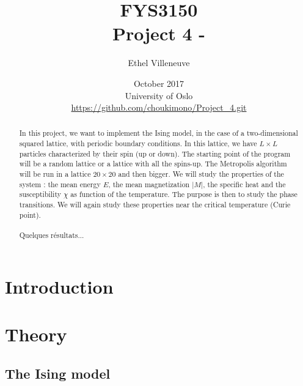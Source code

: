 \documentclass[a4paper, twoside, 11pt]{report}
\title{FYS3150\\Project 4 - }
\author{Ethel Villeneuve}
\date{October 2017 \\University of Oslo \\ \url{https://github.com/choukimono/Project_4.git}}
\theoremstyle{theorem}
\theoremstyle{remark}
\theoremstyle{exemple}
\begin{document}
\maketitle
	
	
\begin{abstract}
    
    \paragraph{}In this project, we want to implement the Ising model, in the case of a two-dimensional squared lattice, with periodic boundary conditions. In this lattice, we have $L\times L$ particles characterized by their spin (up or down). The starting point of the program will be a random lattice or a lattice with all the spins-up. The Metropolis algorithm will be run in a lattice $20\times20$ and then bigger. We will study the properties of the system : the mean energy $E$, the mean magnetization $|M|$, the specific heat and the susceptibility $\chi$ as function of the temperature. The purpose is then to study the phase transitions. We will again study these properties near the critical temperature (Curie point).
    
    \paragraph{}Quelques résultats...
    
\end{abstract}


\tableofcontents


\chapter*{Introduction}

    \paragraph{}
    

\chapter{Theory}
    
    \section{The Ising model}
    
\end{document}

